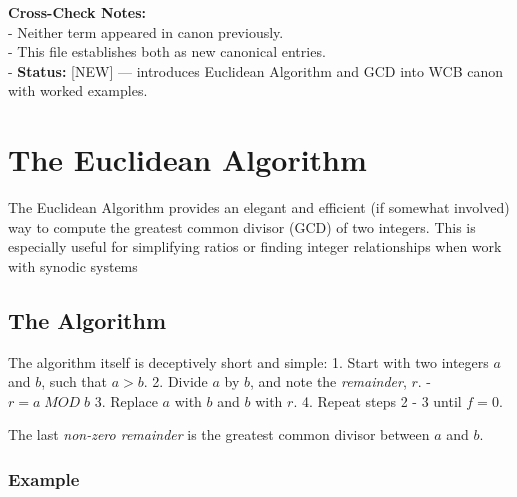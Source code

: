 \documentclass[
  letterpaper,
]{book}
\begin{document}
\textbf{Cross-Check Notes:}\\
- Neither term appeared in canon previously.\\
- This file establishes both as new canonical entries.\\
- \textbf{Status:} {[}NEW{]} --- introduces Euclidean Algorithm and GCD
into WCB canon with worked examples.

\chapter{The Euclidean Algorithm}\label{the-euclidean-algorithm}

The Euclidean Algorithm provides an elegant and efficient (if somewhat
involved) way to compute the greatest common divisor (GCD) of two
integers. This is especially useful for simplifying ratios or finding
integer relationships when work with synodic systems

\section{The Algorithm}\label{the-algorithm}

The algorithm itself is deceptively short and simple: 1. Start with two
integers \(a\) and \(b\), such that \(a>b\). 2. Divide \(a\) by \(b\),
and note the \emph{remainder}, \(r\). - \(r = a\; MOD\; b\) 3. Replace
\(a\) with \(b\) and \(b\) with \(r\). 4. Repeat steps 2 - 3 until
\(f = 0\).

The last \emph{non-zero remainder} is the greatest common divisor
between \(a\) and \(b\).

\subsection{Example}\label{example-3}
\end{document}

